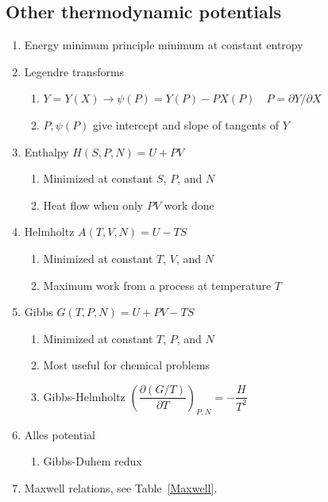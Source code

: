 \documentclass[11pt]{article}
\begin{document}
\subsection{Other thermodynamic potentials}
\label{sec:org38dd8f5}
\begin{enumerate}
\item Energy minimum principle minimum at constant entropy
\item Legendre transforms
\begin{enumerate}
\item \(Y=Y(X) \rightarrow \psi(P) = Y(P)-PX(P) \quad P=\partial Y /\partial X\)
\item \(P,\psi(P)\) give intercept and slope of tangents of \(Y\)
\end{enumerate}
\item Enthalpy \(H(S,P,N) = U + PV\)
\begin{enumerate}
\item Minimized at constant \(S\), \(P\), and \(N\)
\item Heat flow when only \(PV\) work done
\end{enumerate}
\item Helmholtz \(A(T,V,N) = U - TS\)
\begin{enumerate}
\item Minimized at constant \(T\), \(V\), and \(N\)
\item Maximum work from a process at temperature \(T\)
\end{enumerate}
\item Gibbs \(G(T,P,N) = U + PV - TS\)
\begin{enumerate}
\item Minimized at constant \(T\), \(P\), and \(N\)
\item Most useful for chemical problems
\item Gibbs-Helmholtz \(\left ( \dfrac{\partial (G/T)}{\partial T} \right )_{P,N} = -\dfrac{H}{T^2}\)
\end{enumerate}
\item Alles potential
\begin{enumerate}
\item Gibbs-Duhem redux
\end{enumerate}
\item Maxwell relations, see Table~\ref{Maxwell}.
\end{enumerate}
\end{document}
